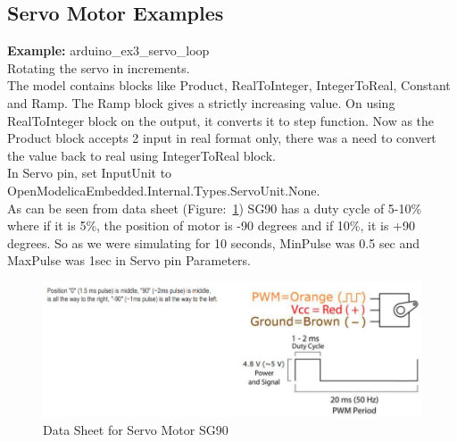 \documentclass[12pt,a4paper]{report}
\begin{document}
\subsection{Servo Motor Examples}
\textbf{Example:} arduino\_ex3\_servo\_loop\\

Rotating the servo in increments. \\

The model contains blocks like Product, RealToInteger, IntegerToReal, Constant and Ramp. The Ramp block gives a strictly increasing value. On using RealToInteger block on the output, it converts it to step function. Now as the Product block accepts 2 input in real format only, there was a need to convert the value back to real using IntegerToReal block.\\

In Servo pin, set InputUnit to OpenModelicaEmbedded.Internal.Types.ServoUnit.None. \\

As can be seen from data sheet (Figure:~\ref{figure:27}) SG90 has a duty cycle of 5-10\% where if it is 5\%, the position of motor is -90 degrees and if 10\%, it is +90 degrees. So as we were simulating for 10 seconds, MinPulse was 0.5 sec and MaxPulse was 1sec in Servo pin Parameters.

\begin{figure}[H]
\centering
\includegraphics[width =\textwidth]{servo_datasheet}
\caption{Data Sheet for Servo Motor SG90}
\label{figure:27}
\end{figure}
\end{document}
